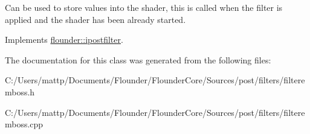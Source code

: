 Can be used to store values into the shader, this is called when the filter is applied and the shader has been already started. 



Implements \hyperlink{classflounder_1_1ipostfilter_a9b658b4672718d5ac36539875bde722e}{flounder\+::ipostfilter}.



The documentation for this class was generated from the following files\+:\begin{DoxyCompactItemize}
\item 
C\+:/\+Users/mattp/\+Documents/\+Flounder/\+Flounder\+Core/\+Sources/post/filters/filteremboss.\+h\item 
C\+:/\+Users/mattp/\+Documents/\+Flounder/\+Flounder\+Core/\+Sources/post/filters/filteremboss.\+cpp\end{DoxyCompactItemize}
